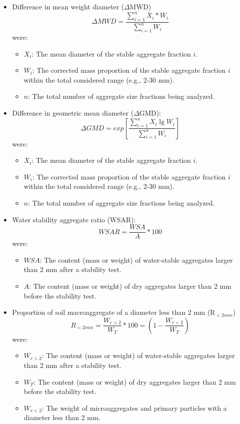 \begin{itemize}
  \item Difference in mean weight diameter ($\Delta$MWD)
    $$\Delta MWD = \frac{\sum_{i=1}^{n} X_i*W_i}{\sum_{i=1}^{n} W_i}$$
    were:
    \begin{itemize}
        \item $X_i$: The mean diameter of the stable aggregate fraction $i$.
        \item $W_i$: The corrected mass proportion of the stable aggregate fraction $i$ within the total considered range (e.g., 2-30 mm).
        \item $n$: The total number of aggregate size fractions being analyzed.
    \end{itemize}
  \item Difference in geometric mean diameter ($\Delta$GMD):
    $$\Delta GMD = exp \left[\frac{\sum_{i=1}^{n} X_i\lg W_i}{\sum_{i=1}^{n} W_i}\right]$$
    were:
    \begin{itemize}
        \item $X_i$: The mean diameter of the stable aggregate fraction $i$.
        \item $W_i$: The corrected mass proportion of the stable aggregate fraction $i$ within the total considered range (e.g., 2-30 mm).
        \item $n$: The total number of aggregate size fractions being analyzed.
    \end{itemize}
  \item Water stability aggregate ratio (WSAR):
    $$WSAR = \frac{WSA}{A}*100$$
    were:
    \begin{itemize}
        \item $WSA$: The content (mass or weight) of water-stable aggregates larger than 2 mm after a stability test.
        \item $A$: The content (mass or weight) of dry aggregates larger than 2 mm before the stability test.
    \end{itemize}
  \item Proportion of soil macroaggregate of a diameter less than 2 mm (R$_{<2mm}$)
    $$R_{<2mm}=\frac{W_{r>2}}{W_T}*100 = \left(1-\frac{W_{r<2}}{W_T}\right)$$
    were:
    \begin{itemize}
        \item $W_{r>2}$: The content (mass or weight) of water-stable aggregates larger than 2 mm after a stability test.
        \item $W_T$: The content (mass or weight) of dry aggregates larger than 2 mm before the stability test.
        \item $W_{r<2}$: The weight of microaggregates and primary particles with a diameter less than 2 mm.
    \end{itemize}
\end{itemize}

